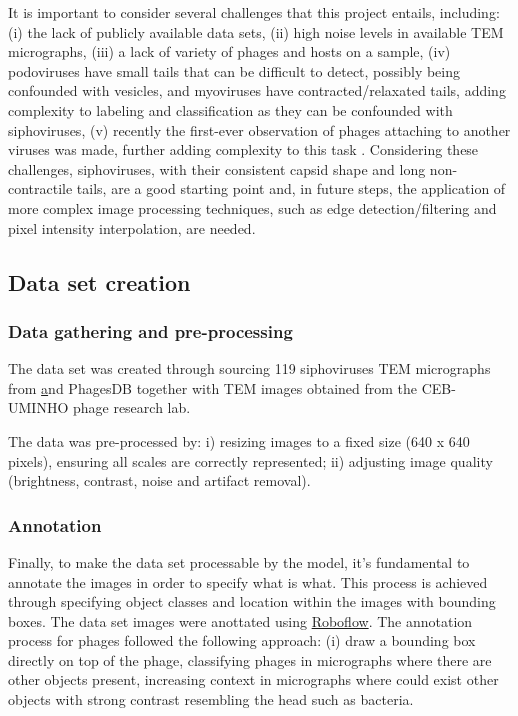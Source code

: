 \documentclass[runningheads]{llncs}
\begin{document}
It is important to consider several challenges that this project entails, including: (i) the lack of publicly available data sets, (ii) high noise levels in available TEM micrographs, (iii) a lack of variety of phages and hosts on a sample, (iv) podoviruses have small tails that can be difficult to detect, possibly being confounded with vesicles, and myoviruses have contracted/relaxated tails, adding complexity to labeling and classification as they can be confounded with siphoviruses, (v) recently the first-ever observation of phages attaching to another viruses was made, further adding complexity to this task \cite{deCarvalho2023}. Considering these challenges, siphoviruses, with their consistent capsid shape and long non-contractile tails, are a good starting point and, in future steps, the application of more complex image processing techniques, such as edge detection/filtering and pixel intensity interpolation, are needed. 

\subsection{Data set creation}

\subsubsection{Data gathering and pre-processing}

The data set was created through sourcing 119 siphoviruses TEM micrographs from \href{https://phagesdb.org/} and {PhagesDB} together with TEM images obtained from the CEB-UMINHO phage research lab.

The data was pre-processed by: i) resizing images to a fixed size (640 x 640 pixels), ensuring all scales are correctly represented; ii) adjusting image quality (brightness, contrast, noise and artifact removal).

\subsubsection{Annotation}
Finally, to make the data set processable by the model, it’s fundamental to annotate the images in order to specify what is what. This process is achieved through specifying object classes and location within the images with bounding boxes. The data set images were anottated using \href{https://docs.ultralytics.com/integrations/roboflow/}{Roboflow}. The annotation process for phages followed the following approach: (i) draw a bounding box directly on top of the phage, classifying phages in micrographs where there are other objects present, increasing context in micrographs where could exist other objects with strong contrast resembling the head such as bacteria.
\end{document}
